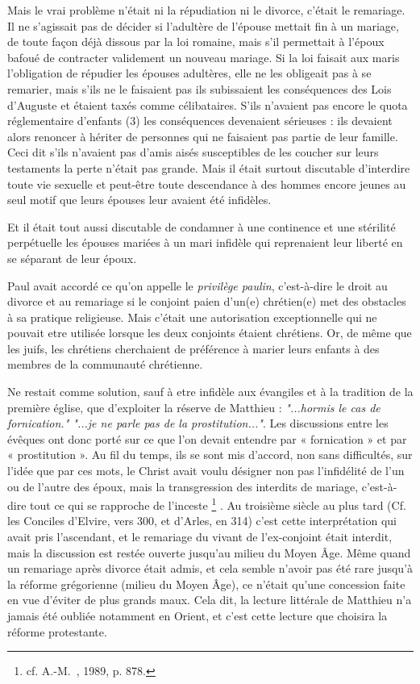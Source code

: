  Mais le vrai problème n'était ni la répudiation ni le divorce, c'était le remariage. Il ne s'agissait pas de décider si l'adultère de l'épouse mettait fin à un mariage, de toute façon déjà dissous par la loi romaine, mais s'il permettait à l'époux bafoué de contracter validement un nouveau mariage. Si la loi faisait aux maris l'obligation de répudier les épouses adultères, elle ne les obligeait pas à se remarier, mais s'ils ne le faisaient pas ils subissaient les conséquences des Lois d'Auguste et étaient taxés comme célibataires. S'ils n'avaient pas encore le quota réglementaire d'enfants (3) les conséquences devenaient sérieuses : ils devaient alors renoncer à hériter de personnes qui ne faisaient pas partie de leur famille. Ceci dit s'ils n'avaient pas d'amis aisés susceptibles de les coucher sur leurs testaments la perte n'était pas grande. Mais il était surtout discutable d'interdire toute vie sexuelle et peut-être toute descendance à des hommes encore jeunes au seul motif que leurs épouses leur avaient été infidèles. 
 
 Et il était tout aussi discutable de condamner à une continence et une stérilité perpétuelle les épouses mariées à un mari infidèle qui reprenaient leur liberté en se séparant de leur époux. 
 
 Paul avait accordé ce qu'on appelle le \emph{privilège paulin}, c'est-à-dire le droit au divorce et au remariage si le conjoint paien d'un(e) chrétien(e) met des obstacles à sa pratique religieuse. Mais c'était une  autorisation exceptionnelle qui ne pouvait etre utilisée lorsque les deux conjoints étaient chrétiens. Or, de même que les juifs, les chrétiens cherchaient de préférence à marier leurs enfants à des membres de la communauté chrétienne.  
 
 Ne restait comme solution, sauf à etre infidèle aux évangiles et à la tradition de la première église, que d'exploiter la réserve de Matthieu : \emph{"...hormis le cas de fornication." "...je ne parle pas de la prostitution..."}. Les discussions entre les évêques ont donc porté sur ce que l'on devait entendre par « fornication » et par « prostitution ». Au fil du temps, ils se sont mis d'accord, non sans difficultés, sur l'idée que par ces mots, le Christ avait voulu désigner non pas l'infidélité de l'un ou de l'autre des époux, mais la transgression des interdits de mariage, c'est-à-dire tout ce qui se rapproche de l'inceste%
\footnote{cf. A.-M.~, 1989, p. 878.}%
. Au troisième siècle au plus tard (Cf. les Conciles d'Elvire, vers 300, et d'Arles, en 314) c'est cette interprétation qui avait pris l'ascendant, et le remariage du vivant de l'ex-conjoint était interdit, mais la discussion est restée ouverte jusqu'au milieu du Moyen Âge. Même quand un remariage après divorce était admis, et cela semble n'avoir pas été rare jusqu'à la réforme grégorienne (milieu du Moyen Âge), ce n'était qu'une concession faite en vue d'éviter de plus grands maux. Cela dit, la lecture littérale de Matthieu n'a jamais été oubliée notamment en Orient, et c'est cette lecture que choisira la réforme protestante.

